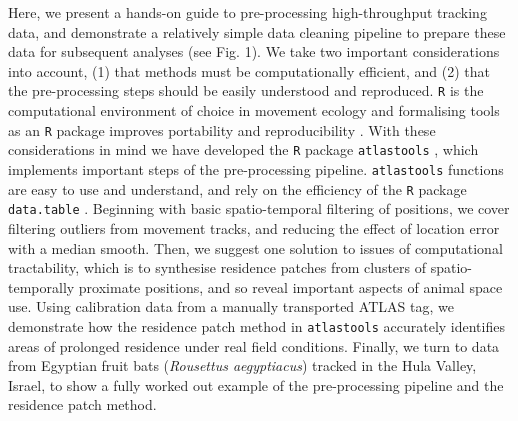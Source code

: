 \documentclass[10pt,paper=a4,headings=standardclasses
]{scrartcl}
\begin{document}
Here, we present a hands-on guide to pre-processing high-throughput tracking data, and demonstrate a relatively simple data cleaning pipeline to prepare these data for subsequent analyses (see Fig. 1). 
We take two important considerations into account, (1) that methods must be computationally efficient, and (2) that the pre-processing steps should be easily understood and reproduced.
\texttt{R} is the computational environment of choice in movement ecology \citep{joo2020} and formalising tools as an \texttt{R} package improves portability and reproducibility \citep{marwick2018}.
With these considerations in mind we have developed the \texttt{R} package \texttt{atlastools} \citep{gupte2020a, rcoreteam2020}, which implements important steps of the pre-processing pipeline.
\texttt{atlastools} functions are easy to use and understand, and rely on the efficiency of the \texttt{R} package \texttt{data.table} \citep{dowle2020}.
Beginning with basic spatio-temporal filtering of positions, we cover filtering outliers from movement tracks, and reducing the effect of location error with a median smooth.
Then, we suggest one solution to issues of computational tractability, which is to synthesise residence patches \citep[\textit{sensu}][]{bijleveld2016, oudman2018, barraquand2008} from clusters of spatio-temporally proximate positions, and so reveal important aspects of animal space use.
Using calibration data from a manually transported ATLAS tag, we demonstrate how the residence patch method in \texttt{atlastools} accurately identifies areas of prolonged residence under real field conditions.
Finally, we turn to data from Egyptian fruit bats (\textit{Rousettus aegyptiacus}) tracked in the Hula Valley, Israel, to show a fully worked out example of the pre-processing pipeline and the residence patch method.
\end{document}
